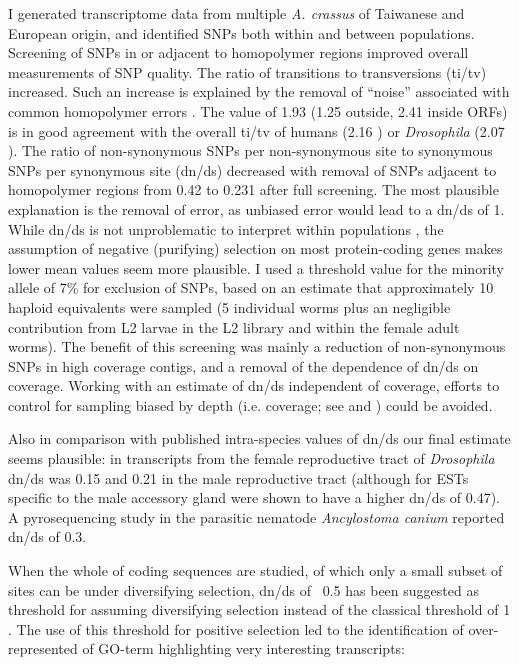 I generated transcriptome data from multiple \textit{A. crassus} of
Taiwanese and European origin, and identified SNPs both within and
between populations. Screening of SNPs in or adjacent to homopolymer
regions improved overall measurements of SNP quality. The ratio of
transitions to transversions (ti/tv) increased. Such an increase is
explained by the removal of ``noise'' associated with common homopolymer
errors \cite{pmid21685085}. The value of 1.93 (1.25 outside, 2.41
inside ORFs) is in good agreement with the overall ti/tv of humans
(2.16 \cite{pmid21169219}) or \textit{Drosophila} (2.07
\cite{pmid21143862}). The ratio of non-synonymous SNPs per
non-synonymous site to synonymous SNPs per synonymous site (dn/ds)
decreased with removal of SNPs adjacent to homopolymer regions from
0.42 to 0.231 after full screening. The most plausible explanation is
the removal of error, as unbiased error would lead to a dn/ds of
1. While dn/ds is not unproblematic to interpret within populations
\cite{pmid19081788}, the assumption of negative (purifying) selection
on most protein-coding genes makes lower mean values seem more
plausible. I used a threshold value for the minority allele of 7\%
for exclusion of SNPs, based on an estimate that approximately 10
haploid equivalents were sampled (5 individual worms plus an
negligible contribution from L2 larvae in the L2 library and within
the female adult worms). The benefit of this screening was mainly a
reduction of non-synonymous SNPs in high coverage contigs, and a
removal of the dependence of dn/ds on coverage. Working with an
estimate of dn/ds independent of coverage, efforts to control for
sampling biased by depth (i.e. coverage; see \cite{pmid18590545} and
\cite{pmid20478048}) could be avoided.

Also in comparison with published intra-species values of dn/ds our
final estimate seems plausible: in transcripts from the female
reproductive tract of \textit{Drosophila} dn/ds was 0.15
\cite{pmid15579698} and 0.21 in the male reproductive tract
\cite{pmid11404480} (although for ESTs specific to the male accessory
gland were shown to have a higher dn/ds of 0.47). A pyrosequencing
study in the parasitic nematode \textit{Ancylostoma canium}
\cite{pmid20470405} reported dn/ds of 0.3.

When the whole of coding sequences are studied, of which only a small
subset of sites can be under diversifying selection, dn/ds of ~0.5 has
been suggested as threshold for assuming diversifying selection
\cite{pmid15579698} instead of the classical threshold of 1
\cite{pmid6449605}. The use of this threshold for positive selection
led to the identification of over-represented of GO-term highlighting
very interesting transcripts:

